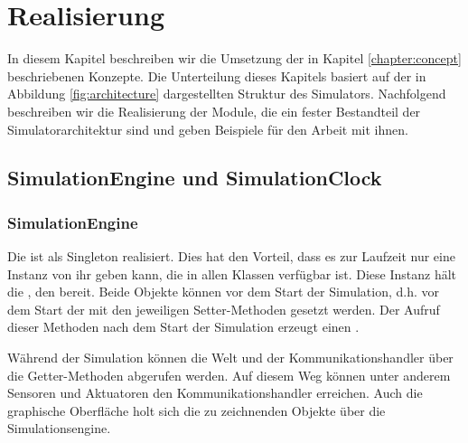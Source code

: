 \chapter{Realisierung}\label{chapter:realization}
In diesem Kapitel beschreiben wir die Umsetzung der in Kapitel \ref{chapter:concept} beschriebenen Konzepte. Die Unterteilung dieses Kapitels basiert auf der in Abbildung \ref{fig:architecture} dargestellten Struktur des Simulators. Nachfolgend beschreiben wir die Realisierung der Module, die ein fester Bestandteil der Simulatorarchitektur sind und geben Beispiele für den Arbeit mit ihnen.
%

\section{SimulationEngine und SimulationClock}\label{subsec:real_engine}
\subsection{SimulationEngine}
Die  ist als Singleton realisiert. Dies hat den Vorteil, dass es zur Laufzeit nur eine Instanz von ihr geben kann, die in allen Klassen verfügbar ist. Diese Instanz hält die , den  bereit. Beide Objekte können vor dem Start der Simulation, d.h. vor dem Start der  mit den jeweiligen Setter-Methoden gesetzt werden. Der Aufruf dieser Methoden nach dem Start der Simulation erzeugt einen .

Während der Simulation können die Welt und der Kommunikationshandler über die Getter-Methoden abgerufen werden. Auf diesem Weg können unter anderem Sensoren und Aktuatoren den Kommunikationshandler erreichen. Auch die graphische Oberfläche holt sich die zu zeichnenden Objekte über die Simulationsengine.

